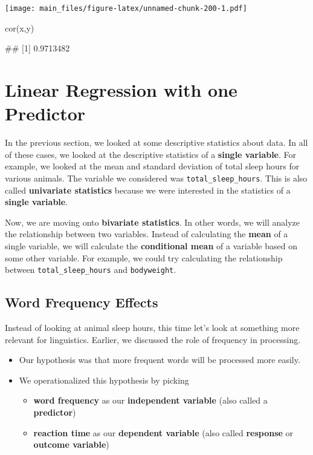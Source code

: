 \documentclass[
]{book}
\newenvironment{Shaded}{\begin{snugshade}}{\end{snugshade}}
\newcommand{\FunctionTok}[1]{\textcolor[rgb]{0.00,0.00,0.00}{#1}}
\newcommand{\NormalTok}[1]{#1}
\providecommand{\tightlist}{%
  \setlength{\itemsep}{0pt}\setlength{\parskip}{0pt}}
\begin{document}
\texttt{[image: main\_files/figure-latex/unnamed-chunk-200-1.pdf]}

\begin{Shaded}
\begin{Highlighting}[]
\FunctionTok{cor}\NormalTok{(x,y)}
\end{Highlighting}
\end{Shaded}

\begin{Shaded}
\begin{Highlighting}[]
\NormalTok{\#\# [1] 0.9713482}
\end{Highlighting}
\end{Shaded}

\hypertarget{linear-regression-with-one-predictor}{%
\chapter{Linear Regression with one Predictor}\label{linear-regression-with-one-predictor}}

In the previous section, we looked at some descriptive statistics about data. In all of these cases, we looked at the descriptive statistics of a \textbf{single variable}. For example, we looked at the mean and standard deviation of total sleep hours for various animals. The variable we considered was \texttt{total\_sleep\_hours}. This is also called \textbf{univariate statistics} because we were interested in the statistics of a \textbf{single variable}.

Now, we are moving onto \textbf{bivariate statistics}. In other words, we will analyze the relationship between two variables. Instead of calculating the \textbf{mean} of a single variable, we will calculate the \textbf{conditional mean} of a variable based on some other variable. For example, we could try calculating the relationship between \texttt{total\_sleep\_hours} and \texttt{bodyweight}.

\hypertarget{word-frequency-effects}{%
\section{Word Frequency Effects}\label{word-frequency-effects}}

Instead of looking at animal sleep hours, this time let's look at something more relevant for linguistics. Earlier, we discussed the role of frequency in processing.

\begin{itemize}
\tightlist
\item
  Our hypothesis was that more frequent words will be processed more easily.
\item
  We operationalized this hypothesis by picking

  \begin{itemize}
  \tightlist
  \item
    \textbf{word frequency} as our \textbf{independent variable} (also called a \textbf{predictor})
  \item
    \textbf{reaction time} as our \textbf{dependent variable} (also called \textbf{response} or \textbf{outcome variable})
  \end{itemize}
\end{itemize}
\end{document}
